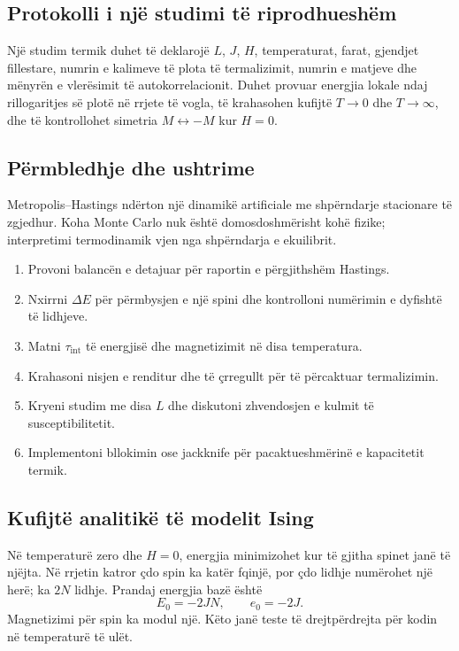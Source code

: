 \documentclass[11pt,oneside,openany]{book}
\begin{document}
\subsection{Protokolli i një studimi të riprodhueshëm}
Një studim termik duhet të deklarojë $L$, $J$, $H$, temperaturat, farat, gjendjet fillestare, numrin e kalimeve të plota të termalizimit, numrin e matjeve dhe mënyrën e vlerësimit të autokorrelacionit. Duhet provuar energjia lokale ndaj rillogaritjes së plotë në rrjete të vogla, të krahasohen kufijtë $T\to0$ dhe $T\to\infty$, dhe të kontrollohet simetria $M\leftrightarrow-M$ kur $H=0$.

\subsection{Përmbledhje dhe ushtrime}
Metropolis--Hastings ndërton një dinamikë artificiale me shpërndarje stacionare të zgjedhur. Koha Monte Carlo nuk është domosdoshmërisht kohë fizike; interpretimi termodinamik vjen nga shpërndarja e ekuilibrit.
\begin{enumerate}
\item Provoni balancën e detajuar për raportin e përgjithshëm Hastings.
\item Nxirrni $\Delta E$ për përmbysjen e një spini dhe kontrolloni numërimin e dyfishtë të lidhjeve.
\item Matni $\tau_{\mathrm{int}}$ të energjisë dhe magnetizimit në disa temperatura.
\item Krahasoni nisjen e renditur dhe të çrregullt për të përcaktuar termalizimin.
\item Kryeni studim me disa $L$ dhe diskutoni zhvendosjen e kulmit të susceptibilitetit.
\item Implementoni bllokimin ose jackknife për pacaktueshmërinë e kapacitetit termik.
\end{enumerate}



\subsection{Kufijtë analitikë të modelit Ising}
Në temperaturë zero dhe $H=0$, energjia minimizohet kur të gjitha spinet janë të njëjta. Në rrjetin katror çdo spin ka katër fqinjë, por çdo lidhje numërohet një herë; ka $2N$ lidhje. Prandaj energjia bazë është
\begin{equation}
 E_0=-2JN,\qquad e_0=-2J.
\end{equation}
Magnetizimi për spin ka modul një. Këto janë teste të drejtpërdrejta për kodin në temperaturë të ulët.
\end{document}
